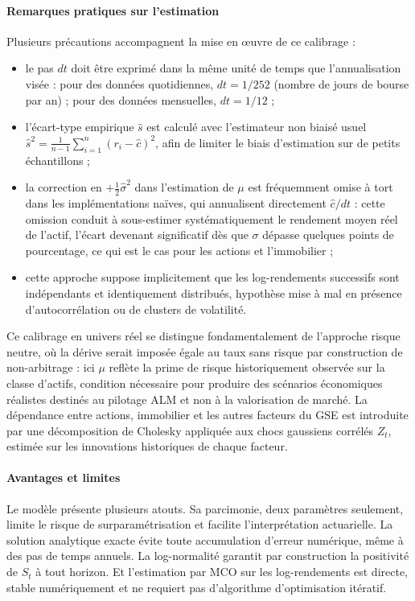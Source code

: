 \paragraph{Remarques pratiques sur l'estimation}
Plusieurs précautions accompagnent la mise en œuvre de ce calibrage :
\begin{itemize}
    \item le pas $dt$ doit être exprimé dans la même unité de temps que l'annualisation visée : pour des données quotidiennes, $dt = 1/252$ (nombre de jours de bourse par an) ; pour des données mensuelles, $dt = 1/12$ ;
    \item l'écart-type empirique $\hat{s}$ est calculé avec l'estimateur non biaisé usuel $\hat{s}^2 = \frac{1}{n-1}\sum_{i=1}^n (r_i - \hat{c})^2$, afin de limiter le biais d'estimation sur de petits échantillons ;
    \item la correction en $+\tfrac{1}{2}\hat{\sigma}^2$ dans l'estimation de $\mu$ est fréquemment omise à tort dans les implémentations naïves, qui annualisent directement $\hat{c}/dt$ : cette omission conduit à sous-estimer systématiquement le rendement moyen réel de l'actif, l'écart devenant significatif dès que $\sigma$ dépasse quelques points de pourcentage, ce qui est le cas pour les actions et l'immobilier ;
    \item cette approche suppose implicitement que les log-rendements successifs sont indépendants et identiquement distribués, hypothèse mise à mal en présence d'autocorrélation ou de clusters de volatilité.
\end{itemize}

Ce calibrage en univers réel se distingue fondamentalement de l'approche risque neutre, où la dérive serait imposée égale au taux sans risque par construction de non-arbitrage : ici $\mu$ reflète la prime de risque historiquement observée sur la classe d'actifs, condition nécessaire pour produire des scénarios économiques réalistes destinés au pilotage ALM et non à la valorisation de marché. La dépendance entre actions, immobilier et les autres facteurs du GSE est introduite par une décomposition de Cholesky appliquée aux chocs gaussiens corrélés $Z_t$, estimée sur les innovations historiques de chaque facteur.

\paragraph{Avantages et limites}

Le modèle présente plusieurs atouts. Sa parcimonie, deux paramètres seulement, limite le risque de surparamétrisation et facilite l'interprétation actuarielle. La solution analytique exacte évite toute accumulation d'erreur numérique, même à des pas de temps annuels. La log-normalité garantit par construction la positivité de $S_t$ à tout horizon. Et l'estimation par MCO sur les log-rendements est directe, stable numériquement et ne requiert pas d'algorithme d'optimisation itératif.

